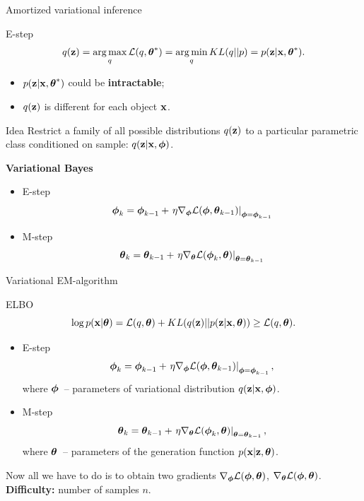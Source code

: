 \begin{frame}{Amortized variational inference}
    \begin{block}{E-step}
    \vspace{-0.3cm}
    \[
		q(\mathbf{z}) = \operatorname*{arg\,max}_q \mathcal{L} (q, \boldsymbol{\theta}^*) = \operatorname*{arg\,min}_q KL(q || p) =
		 p(\mathbf{z}| \mathbf{x}, \boldsymbol{\theta}^*).
	\]
	\begin{itemize}
		\item $p(\mathbf{z}| \mathbf{x}, \boldsymbol{\theta}^*)$ could be \textbf{intractable};
		\item $q(\mathbf{z})$ is different for each object $\mathbf{x}$.
	\end{itemize}
    \end{block}
	\begin{block}{Idea}
	Restrict a family of all possible distributions $q(\mathbf{z})$ to a particular parametric class conditioned on sample: $q(\mathbf{z}|\mathbf{x}, \boldsymbol{\phi})$.
	\end{block}
	
	\textbf{Variational Bayes}
	\begin{itemize}
		\item E-step
		\[
		\boldsymbol{\phi}_k = \boldsymbol{\phi}_{k-1} + \left.\eta \nabla_{\boldsymbol{\phi}} \mathcal{L}(\boldsymbol{\phi}, \boldsymbol{\theta}_{k-1})\right|_{\boldsymbol{\phi}=\boldsymbol{\phi}_{k-1}}
		\]
		\item M-step
		\[
		\boldsymbol{\theta}_k = \boldsymbol{\theta}_{k-1} + \left.\eta \nabla_{\boldsymbol{\theta}} \mathcal{L}(\boldsymbol{\phi}_k, \boldsymbol{\theta})\right|_{\boldsymbol{\theta}=\boldsymbol{\theta}_{k-1}}
		\]
	\end{itemize}
\end{frame}%
\begin{frame}{Variational EM-algorithm}

	\begin{block}{ELBO}
		\vspace{-0.1cm}
		\[
		\log p(\mathbf{x}| \boldsymbol{\theta}) = \mathcal{L} (q, \boldsymbol{\theta}) + KL(q(\mathbf{z}) || p(\mathbf{z}|\mathbf{x}, \boldsymbol{\theta})) \geq \mathcal{L} (q, \boldsymbol{\theta}).
		\]
	\end{block}
	\begin{itemize}
		\item E-step
		\[
		\boldsymbol{\phi}_k = \boldsymbol{\phi}_{k-1} + \left.\eta \nabla_{\boldsymbol{\phi}} \mathcal{L}(\boldsymbol{\phi}, \boldsymbol{\theta}_{k-1})\right|_{\boldsymbol{\phi}=\boldsymbol{\phi}_{k-1}},
		\]
		where $\boldsymbol{\phi}$~-- parameters of variational distribution $q(\mathbf{z} | \mathbf{x}, \boldsymbol{\phi})$.
		\item M-step
		\[
		\boldsymbol{\theta}_k = \boldsymbol{\theta}_{k-1} + \left.\eta \nabla_{\boldsymbol{\theta}} \mathcal{L}(\boldsymbol{\phi}_k, \boldsymbol{\theta})\right|_{\boldsymbol{\theta}=\boldsymbol{\theta}_{k-1}},
		\]
		where $\boldsymbol{\theta}$~-- parameters of the generation function $p(\mathbf{x} | \mathbf{z}, \boldsymbol{\theta})$.
	\end{itemize}
	Now all we have to do is to obtain two gradients $\nabla_{\boldsymbol{\phi}} \mathcal{L}(\boldsymbol{\phi}, \boldsymbol{\theta})$, $\nabla_{\boldsymbol{\theta}} \mathcal{L}(\boldsymbol{\phi}, \boldsymbol{\theta})$.  \\
	\textbf{Difficulty:} number of samples $n$.
\end{frame}
